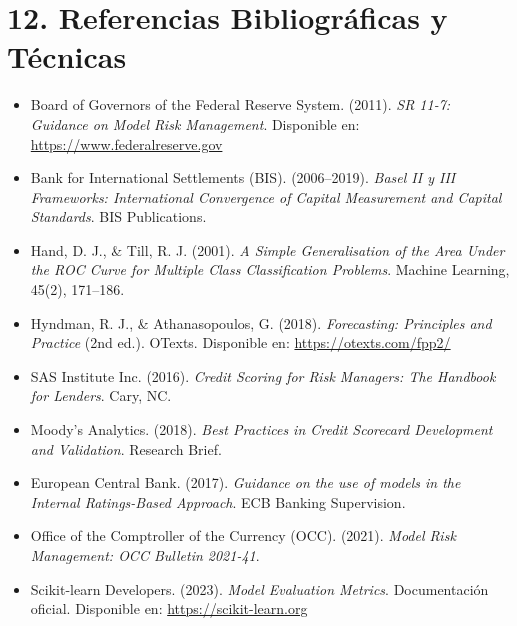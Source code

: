 \documentclass[11pt,oneside]{article}%
\begin{document}
\newpage 

\section*{12. Referencias Bibliográficas y Técnicas}

\begin{itemize}
  \item Board of Governors of the Federal Reserve System. (2011). \textit{SR 11-7: Guidance on Model Risk Management}. Disponible en: \url{https://www.federalreserve.gov}
  
  \item Bank for International Settlements (BIS). (2006--2019). \textit{Basel II y III Frameworks: International Convergence of Capital Measurement and Capital Standards}. BIS Publications.
  
  \item Hand, D. J., \& Till, R. J. (2001). \textit{A Simple Generalisation of the Area Under the ROC Curve for Multiple Class Classification Problems}. Machine Learning, 45(2), 171--186.
  
  \item Hyndman, R. J., \& Athanasopoulos, G. (2018). \textit{Forecasting: Principles and Practice} (2nd ed.). OTexts. Disponible en: \url{https://otexts.com/fpp2/}
  
  \item SAS Institute Inc. (2016). \textit{Credit Scoring for Risk Managers: The Handbook for Lenders}. Cary, NC.
  
  \item Moody’s Analytics. (2018). \textit{Best Practices in Credit Scorecard Development and Validation}. Research Brief.
  
  \item European Central Bank. (2017). \textit{Guidance on the use of models in the Internal Ratings-Based Approach}. ECB Banking Supervision.
  
  \item Office of the Comptroller of the Currency (OCC). (2021). \textit{Model Risk Management: OCC Bulletin 2021-41}.
  
  \item Scikit-learn Developers. (2023). \textit{Model Evaluation Metrics}. Documentación oficial. Disponible en: \url{https://scikit-learn.org}
  
\end{itemize}
\end{document}
